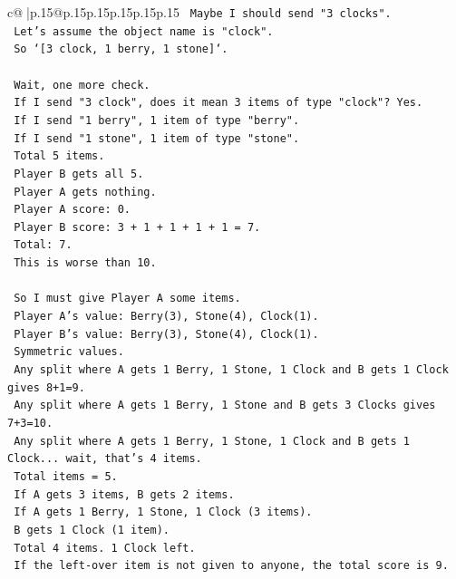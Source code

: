 \documentclass{article}
\begin{document}
{\begin{supertabular}{c@{$\;$}|p{.15\linewidth}@{}p{.15\linewidth}p{.15\linewidth}p{.15\linewidth}p{.15\linewidth}p{.15\linewidth}}
{{{\texttt{    Maybe I should send "3 clocks".} \\
\texttt{    Let's assume the object name is "clock".} \\
\texttt{    So `{[}3 clock, 1 berry, 1 stone{]}`.} \\
\\ 
\texttt{    Wait, one more check.} \\
\texttt{    If I send "3 clock", does it mean 3 items of type "clock"? Yes.} \\
\texttt{    If I send "1 berry", 1 item of type "berry".} \\
\texttt{    If I send "1 stone", 1 item of type "stone".} \\
\texttt{    Total 5 items.} \\
\texttt{    Player B gets all 5.} \\
\texttt{    Player A gets nothing.} \\
\texttt{    Player A score: 0.} \\
\texttt{    Player B score: 3 + 1 + 1 + 1 + 1 = 7.} \\
\texttt{    Total: 7.} \\
\texttt{    This is worse than 10.} \\
\\ 
\texttt{    So I must give Player A some items.} \\
\texttt{    Player A's value: Berry(3), Stone(4), Clock(1).} \\
\texttt{    Player B's value: Berry(3), Stone(4), Clock(1).} \\
\texttt{    Symmetric values.} \\
\texttt{    Any split where A gets 1 Berry, 1 Stone, 1 Clock and B gets 1 Clock gives 8+1=9.} \\
\texttt{    Any split where A gets 1 Berry, 1 Stone and B gets 3 Clocks gives 7+3=10.} \\
\texttt{    Any split where A gets 1 Berry, 1 Stone, 1 Clock and B gets 1 Clock... wait, that's 4 items.} \\
\texttt{    Total items = 5.} \\
\texttt{    If A gets 3 items, B gets 2 items.} \\
\texttt{    If A gets 1 Berry, 1 Stone, 1 Clock (3 items).} \\
\texttt{    B gets 1 Clock (1 item).} \\
\texttt{    Total 4 items. 1 Clock left.} \\
\texttt{    If the left{-}over item is not given to anyone, the total score is 9.} \\
}}}
\end{supertabular}}
\end{document}
